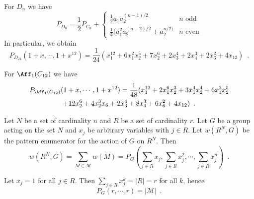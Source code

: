 \begin{example}
	For $D_n$ we have
	\begin{equation}
		P_{D_n} = \frac{1}{2} P_{C_n} +
		\begin{cases}
			\frac{1}{2} a_1 a_2^{(n - 1) / 2} & n \text{ odd} \\
			\frac{1}{4} (a_1^2 a_2^{(n - 2) / 2} + a_2^{n / 2)} & n \text{ even}
		\end{cases}
	\end{equation}
	In particular, we obtain
	\begin{equation}
		P_{D_{24}}(1 + x, \cdots, 1 + x^{12}) = \frac{1}{24} ( x_1^{12} + 6 x_1^2 x_2^5 +
		7 x_2^6 + 2 x_3^4 + 2 x_4^3 + 2 x_6^2 + 4 x_{12} ) \enspace.
	\end{equation}
\end{example}

\begin{example}
	\cite[120]{FripertingerLackner2015}
	For $\Aff_1(C_{12})$ we have
	\begin{multline}
		P_{\Aff_1(C_{12})}(1 + x, \cdots, 1 + x^{12}) = \frac{1}{48} (
		x_1^{12} + 2 x_1^6 x_2^3 + 3 x_1^4 x_2^4 + 6 x_1^2 x_2^5 \\ + 12 x_2^6 +
		4 x_2^3 x_6 + 2 x_3^4 + 8 x_4^3 + 6 x_6^2 + 4 x_{12} ) \enspace.
	\end{multline}
\end{example}

\begin{theorem}[Polya]
	\cite[88]{Aigner2007}
	\cite[256]{Tucker1974}
	Let $N$ be a set of cardinality $n$ and $R$ be a set of cardinality $r$. Let $G$ be
	a group acting on the set $N$ and $x_j$ be arbitrary variables with $j \in R$.
	Let $w(R^N, G)$ be the pattern enumerator for the action of $G$ on $R^N$. Then
	\begin{equation}
		w(R^N, G) = \sum_{M \in \mathcal{M}} w(M) = P_G(\sum_{j \in R} x_j,
		\sum_{j \in R} x_j^2, \cdots, \sum_{j \in R} x_j^n) \enspace.
	\end{equation}
\end{theorem}

\begin{corollary}
	\cite[89]{Aigner2007}
	\cite[254]{Tucker1974}
	Let $x_j = 1$ for all $j \in R$. Then $\sum_{j \in R} x_j^k = |R| = r$ for all $k$, hence
	\begin{equation}
		P_G(r, \cdots, r) = |\mathcal{M}| \enspace.
	\end{equation}
\end{corollary}

